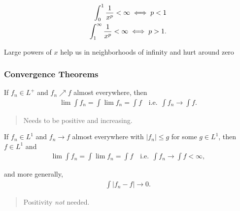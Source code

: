 \begin{theorem}

\begin{align*}
\int_0^1 {1\over x^p} < \infty \iff  p < 1 \\
\int_1^\infty {1\over x^p} < \infty \iff  p > 1 
.\end{align*}

\end{theorem}

\begin{slogan}

Large powers of \(x\) help us in neighborhoods of infinity and hurt
around zero

\end{slogan}

\hypertarget{convergence-theorems}{%
\subsubsection{Convergence Theorems}\label{convergence-theorems}}

\begin{theorem}

If \(f_n \in L^+\) and \(f_n \nearrow f\) almost everywhere, then
\begin{align*}
\lim \int f_n
= \int \lim f_n = \int f
\quad \text{i.e.}~~ \int f_n \to \int f
.\end{align*}

\begin{quote}
Needs to be positive and increasing.
\end{quote}

\end{theorem}

\begin{theorem}

If \(f_n \in L^1\) and \(f_n \to f\) almost everywhere with
\({\left\lvert {f_n} \right\rvert} \leq g\) for some \(g\in L^1\), then
\(f\in L^1\) and
\begin{align*}
\lim \int f_n = \int \lim f_n = \int f \quad \text{i.e.}~~ \int f_n \to \int f < \infty
,\end{align*}

and more generally,
\begin{align*}
\int {\left\lvert {f_n - f} \right\rvert} \to 0
.\end{align*}

\begin{quote}
Positivity \emph{not} needed.
\end{quote}

\end{theorem}

